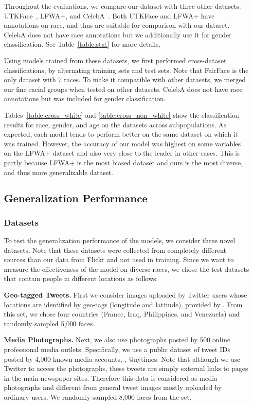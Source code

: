 Throughout the evaluations, we compare our dataset with three other datasets: UTKFace~\cite{zhang2017age}, LFWA+, and CelebA~\cite{liu2015faceattributes}. Both UTKFace and LFWA+ have annotations on race, and thus are suitable for comparison with our dataset. CelebA does not have race annotations but we additionally use it for gender classification. See Table~\ref{table:stat} for more details. 



Using models trained from these datasets, we first performed cross-dataset classifications, by alternating training sets and test sets. Note that FairFace is the only dataset with 7 races. To make it compatible with other datasets, we merged our fine racial groups when tested on other datasets. CelebA does not have race annotations but was included for gender classification. 

Tables~\ref{table:cross_white} and \ref{table:cross_non_white} show the classification results for race, gender, and age on the datasets across subpopulations. As expected, each model tends to perform better on the same dataset on which it was trained. However, the accuracy of our model was highest on some variables on the LFWA+ dataset and also very close to the leader in other cases. This is partly because LFWA+ is the most biased dataset and ours is the most diverse, and thus more generalizable dataset. 


\subsection{Generalization Performance}
\subsubsection{Datasets}
To test the generalization performance of the models, we consider three novel datasets. Note that these datasets were collected from completely different sources than our data from Flickr and not used in training. Since we want to measure the effectiveness of the model on diverse races, we chose the test datasets that contain people in different locations as follows.

\textbf{Geo-tagged Tweets.} 
First we consider images uploaded by Twitter users whose locations are identified by geo-tags (longitude and latitude), provided by \cite{steinert2018twitter}. From this set, we chose four countries (France, Iraq, Philippines, and Venezuela) and randomly sampled 5,000 faces. 

\textbf{Media Photographs.} 
Next, we also use photographs posted by 500 online professional media outlets. Specifically, we use a public dataset of tweet IDs \cite{DVN/2FIFLH_2017} posted by 4,000 known media accounts, \eg, $@$nytimes. Note that although we use Twitter to access the photographs, these tweets are simply external links to pages in the main newspaper sites. Therefore this data is considered as media photographs and different from general tweet images mostly uploaded by ordinary users. We randomly sampled 8,000 faces from the set.

